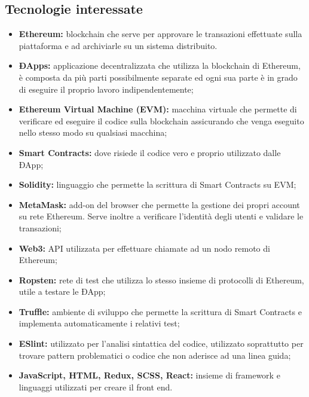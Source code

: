 \documentclass{article}
\begin{document}
	\subsection{Tecnologie interessate}
	\begin{itemize}
		\item \textbf{Ethereum:} blockchain che serve per approvare le transazioni effettuate sulla piattaforma e ad archiviarle su un sistema distribuito. 
		
		\item \textbf{ÐApps:} applicazione decentralizzata che utilizza la blockchain di Ethereum, è composta da più parti possibilmente separate ed ogni sua parte è in grado di eseguire il proprio lavoro indipendentemente; 
		
		\item \textbf{Ethereum Virtual Machine (EVM):} macchina virtuale che permette di verificare ed eseguire il codice sulla blockchain assicurando che venga eseguito nello stesso modo su qualsiasi macchina;
		
		\item \textbf{Smart Contracts:} dove risiede il codice vero e proprio utilizzato dalle ÐApp;
	
		\item \textbf{Solidity:} linguaggio che permette la scrittura di Smart Contracts su EVM;
	
		\item \textbf{MetaMask:} add-on del browser che permette la gestione dei propri account su rete Ethereum. Serve inoltre a verificare l'identità degli utenti e validare le transazioni;
	
		\item \textbf{Web3:} API utilizzata per effettuare chiamate ad un nodo remoto di Ethereum;
	
		\item\textbf{Ropsten:} rete di test che utilizza lo stesso insieme di protocolli di Ethereum, utile a testare le ÐApp;
	
		\item\textbf{Truffle:} ambiente di sviluppo che permette la scrittura di Smart Contracts e implementa automaticamente i relativi test;
		
		\item\textbf{ESlint:} utilizzato per l'analisi sintattica del codice, utilizzato soprattutto per trovare pattern problematici o codice che non aderisce ad una linea guida;
		
		\item \textbf{JavaScript, HTML, Redux, SCSS, React:} insieme di framework e linguaggi utilizzati per creare il front end.
	
 	\end{itemize}
	
\end{document}
